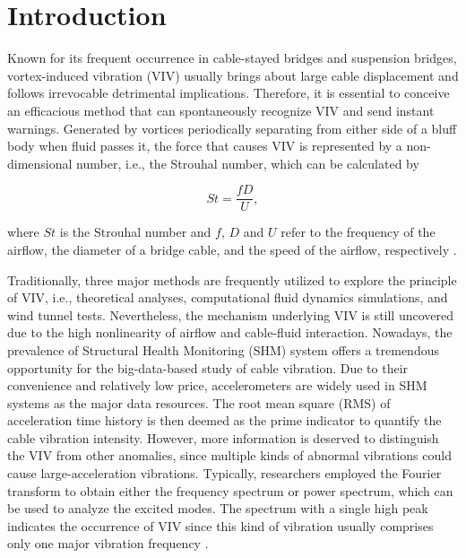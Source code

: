 \documentclass[preprint, 3p, times, compress, 11pt]{elsarticle}
\begin{document}
\section{Introduction}

Known for its frequent occurrence in cable-stayed bridges and suspension 
bridges, vortex-induced vibration (VIV) usually brings about large cable 
displacement and follows irrevocable detrimental implications. Therefore, 
it is essential to conceive an efficacious method that can spontaneously 
recognize VIV and send instant warnings. Generated by vortices 
periodically separating from either side of a bluff body when fluid 
passes it, the force that causes VIV is represented by a non-dimensional 
number, i.e., the Strouhal number, which can be calculated by 

\begin{equation}
    St = \frac{fD}{U},
    \label{eq:Strouhal}
\end{equation}

where $St$ is the Strouhal number and $f$, $D$ and $U$ refer to the 
frequency of the airflow, the diameter of a bridge 
cable, and the speed of the airflow, respectively \cite{jafari2020windinduced}. 

Traditionally, three major methods are frequently utilized to explore 
the principle of VIV, i.e., theoretical analyses, computational fluid 
dynamics simulations, and wind tunnel tests. Nevertheless, the mechanism 
underlying VIV is still uncovered due to the high nonlinearity of 
airflow and cable-fluid interaction. Nowadays, the prevalence of 
Structural Health Monitoring (SHM) system offers a tremendous 
opportunity for the big-data-based study of cable vibration. Due to 
their convenience and relatively low price, accelerometers are widely 
used in SHM systems as the major data resources. The root mean square (RMS) 
of acceleration time history is then deemed as the prime indicator to 
quantify the cable vibration intensity. However, more information is 
deserved to distinguish the VIV from other anomalies, since multiple 
kinds of abnormal vibrations could cause large-acceleration vibrations. 
Typically, researchers employed the Fourier transform to obtain either 
the frequency spectrum or power spectrum, which can be used to analyze 
the excited modes. The spectrum with a single high peak indicates the 
occurrence of VIV since this kind of vibration usually comprises only 
one major vibration frequency \cite{li2018datadriven}. 
\end{document}
